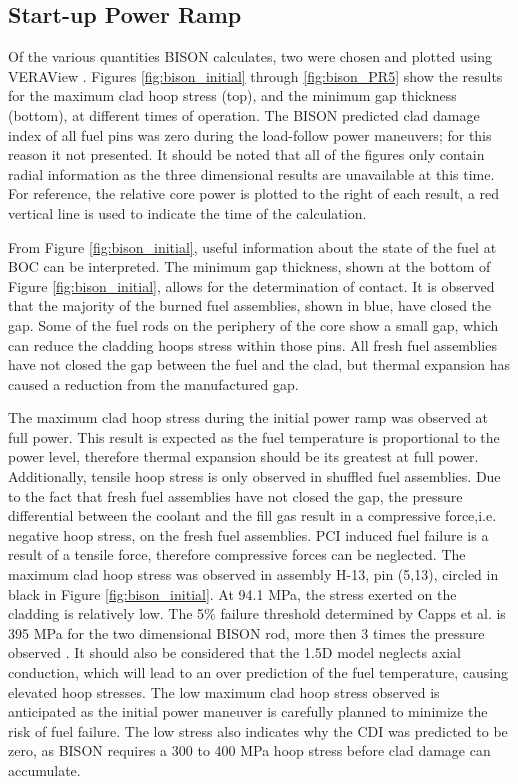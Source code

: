 \documentclass[edeposit,fullpage,11pt]{uiucthesis2009}
\begin{document}
\subsection{Start-up Power Ramp}

Of the various quantities BISON calculates, two were chosen and plotted using VERAView \cite{lee_veraview_2016}.
Figures \ref{fig:bison_initial} through \ref{fig:bison_PR5} show the results for the maximum clad hoop stress (top), and the minimum gap thickness (bottom), at different times of operation. 
The BISON predicted clad damage index of all fuel pins was zero during the load-follow power maneuvers; for this reason it not presented.
It should be noted that all of the figures only contain radial information as the three dimensional results are unavailable at this time. 
For reference, the relative core power is plotted to the right of each result, a red vertical line is used to indicate the time of the calculation.

From Figure \ref{fig:bison_initial}, useful information about the state of the fuel at \gls{BOC}  can be interpreted. 
The minimum gap thickness, shown at the bottom of Figure \ref{fig:bison_initial}, allows for the determination of contact. 
It is observed that the majority of the burned fuel assemblies, shown in blue, have closed the gap. 
Some of the fuel rods on the periphery of the core show a small gap, which can reduce the cladding hoops stress within those pins.
All fresh fuel assemblies have not closed the gap between the fuel and the clad, but thermal expansion has caused a reduction from the manufactured gap.

The maximum clad hoop stress during the initial power ramp was observed at full power.
This result is expected as the fuel temperature is proportional to the power level, therefore thermal expansion should be its greatest at full power.
Additionally, tensile hoop stress is only observed in shuffled fuel assemblies.
Due to the fact that fresh fuel assemblies have not closed the gap, the pressure differential between the coolant and the fill gas result in a compressive force,i.e.  negative hoop stress, on the fresh fuel assemblies.
\gls{PCI} induced fuel failure is a result of a tensile force, therefore compressive forces can be neglected.
The maximum clad hoop stress was observed in assembly H-13, pin (5,13), circled in black in Figure \ref{fig:bison_initial}. 
At 94.1 MPa, the stress exerted on the cladding is relatively low. 
The 5\% failure threshold determined by Capps et al. is 395 MPa for the two dimensional BISON rod, more then 3 times the pressure observed \cite{capps_pci_2017}.
It should also be considered that the 1.5D model neglects axial conduction, which will lead to an over prediction of the fuel temperature, causing elevated hoop stresses.
The low maximum clad hoop stress observed is anticipated as the initial power maneuver is carefully planned to minimize the risk of fuel failure.
The low stress also indicates why the CDI was predicted to be zero, as BISON requires a 300 to 400 MPa hoop stress before clad damage can accumulate.
\end{document}
